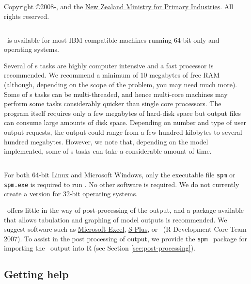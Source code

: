 Copyright \copyright 2008-\SourceControlYearDoc, \href{http://www.niwa.co.nz}{\Organisation} and the \href{http://www.fish.govt.nz}{New Zealand Ministry for Primary Industries}. All rights reserved.

\subsection{}

\SPM\ is available for most IBM compatible machines running 64-bit only  and  operating systems.

Several of \SPM s tasks are highly computer intensive and a fast processor is recommended. We recommend a minimum of 10 megabytes of free RAM (although, depending on the scope of the problem, you may need much more). Some of \SPM s tasks can be multi-threaded, and hence multi-core machines may perform some tasks considerably quicker than single core processors. The program itself requires only a few megabytes of hard-disk space but output files can consume large amounts of disk space. Depending on number and type of user output requests, the output could range from a few hundred kilobytes to several hundred megabytes. However, we note that, depending on the model implemented, some of \SPM s tasks can take a considerable amount of time.

\subsection{}

For both 64-bit Linux and Microsoft Windows, only the executable file \texttt{spm} or \texttt{spm.exe} is required to run \SPM . No other software is required. We do not currently create a version for 32-bit operating systems. 

\SPM\ offers little in the way of  post-processing of the output, and a package available that allows tabulation and graphing of model outputs is recommended. We suggest software such as \href{http://www.microsoft.com}{Microsoft Excel}, \href{http://www.insightful.com}{S-Plus}, or \href{http://www.r-project.org}{\R}\ (R Development Core Team 2007). To assist in the post processing of \SPM output, we provide the \texttt{spm} \R\ package for importing the \SPM\ output into R (see Section \ref{sec:post-processing}).

\subsection{Getting help}

